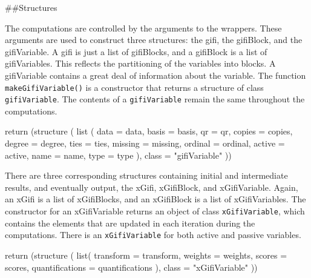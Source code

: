 \documentclass[
  12pt,
]{book}
\newenvironment{Shaded}{\begin{snugshade}}{\end{snugshade}}
\newcommand{\AttributeTok}[1]{\textcolor[rgb]{0.77,0.63,0.00}{#1}}
\newcommand{\FunctionTok}[1]{\textcolor[rgb]{0.00,0.00,0.00}{#1}}
\newcommand{\NormalTok}[1]{#1}
\newcommand{\StringTok}[1]{\textcolor[rgb]{0.31,0.60,0.02}{#1}}
\begin{document}
\#\#Structures

The computations are controlled by the arguments to the wrappers. These arguments are used to construct three structures: the gifi, the gifiBlock, and the gifiVariable. A gifi is just a list of gifiBlocks, and a gifiBlock is a list of gifiVariables. This reflects the partitioning of the variables into blocks. A gifiVariable contains a great deal of information about the variable. The function \texttt{makeGifiVariable()} is a constructor that returns a structure of class \texttt{gifiVariable}. The contents of a \texttt{gifiVariable} remain the same throughout the computations.

\begin{Shaded}
\begin{Highlighting}[]
    \FunctionTok{return}\NormalTok{ (}\FunctionTok{structure}\NormalTok{ (}
      \FunctionTok{list}\NormalTok{ (}
        \AttributeTok{data =}\NormalTok{ data,}
        \AttributeTok{basis =}\NormalTok{ basis,}
        \AttributeTok{qr =}\NormalTok{ qr,}
        \AttributeTok{copies =}\NormalTok{ copies,}
        \AttributeTok{degree =}\NormalTok{ degree,}
        \AttributeTok{ties =}\NormalTok{ ties,}
        \AttributeTok{missing =}\NormalTok{ missing,}
        \AttributeTok{ordinal =}\NormalTok{ ordinal,}
        \AttributeTok{active =}\NormalTok{ active,}
        \AttributeTok{name =}\NormalTok{ name,}
        \AttributeTok{type =}\NormalTok{ type}
\NormalTok{      ),}
      \AttributeTok{class =} \StringTok{"gifiVariable"}
\NormalTok{    ))}
\end{Highlighting}
\end{Shaded}

There are three corresponding structures containing initial and intermediate results, and eventually output, the xGifi, xGifiBlock, and xGifiVariable. Again, an
xGifi is a list of xGifiBlocks, and an xGifiBlock is a list of xGifiVariables. The constructor for an xGifiVariable returns an object of class \texttt{xGifiVariable}, which contains the elements that are updated in each iteration during the computations. There is an \texttt{xGifiVariable} for both active and passive variables.

\begin{Shaded}
\begin{Highlighting}[]
 \FunctionTok{return}\NormalTok{ (}\FunctionTok{structure}\NormalTok{ (}
    \FunctionTok{list}\NormalTok{(}
      \AttributeTok{transform =}\NormalTok{ transform,}
      \AttributeTok{weights =}\NormalTok{ weights,}
      \AttributeTok{scores =}\NormalTok{ scores,}
      \AttributeTok{quantifications =}\NormalTok{ quantifications}
\NormalTok{    ),}
    \AttributeTok{class =} \StringTok{"xGifiVariable"}
\NormalTok{  ))}
\end{Highlighting}
\end{Shaded}
\end{document}
